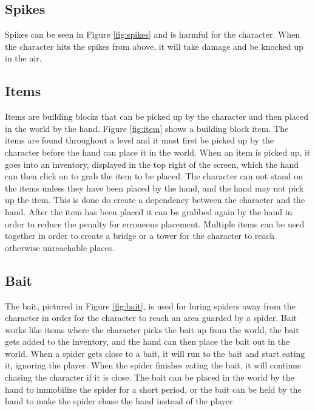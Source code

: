 \subsection{Spikes}


Spikes can be seen in Figure \ref{fig:spikes} and is harmful for the character. When the character hits the spikes from above, it will take damage and be knocked up in the air.

\subsection{Items}


Items are building blocks that can be picked up by the character and then placed in the world by the hand. Figure \ref{fig:item} shows a building block item. The items are found throughout a level and it must first be picked up by the character before the hand can place it in the world. When an item is picked up, it goes into an inventory, displayed in the top right of the screen, which the hand can then click on to grab the item to be placed. The character can not stand on the items unless they have been placed by the hand, and the hand may not pick up the item. This is done do create a dependency between the character and the hand. After the item has been placed it can be grabbed again by the hand in order to reduce the penalty for erroneous placement. Multiple items can be used together in order to create a bridge or a tower for the character to reach otherwise unreachable places.

\subsection{Bait}


The bait, pictured in Figure \ref{fig:bait}, is used for luring spiders away from the character in order for the character to reach an area guarded by a spider. Bait works like items where the character picks the bait up from the world, the bait gets added to the inventory, and the hand can then place the bait out in the world. When a spider gets close to a bait, it will run to the bait and start eating it, ignoring the player. When the spider finishes eating the bait, it will continue chasing the character if it is close. The bait can be placed in the world by the hand to immobilize the spider for a short period, or the bait can be held by the hand to make the spider chase the hand instead of the player.

